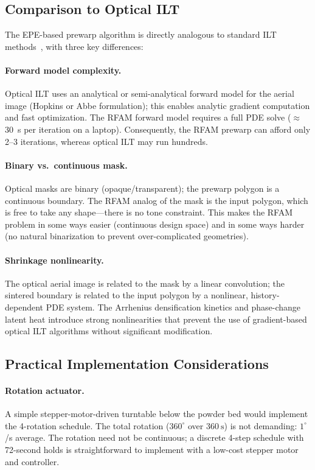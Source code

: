\documentclass[10pt,twocolumn]{article}
\begin{document}
\subsection{Comparison to Optical ILT}

The EPE-based prewarp algorithm is directly analogous to standard ILT
methods~\cite{Jia2014ilt,Shen2009ilt}, with three key differences:

\paragraph{Forward model complexity.}
Optical ILT uses an analytical or semi-analytical forward model for the
aerial image (Hopkins or Abbe formulation); this enables analytic
gradient computation and fast optimization.  The RFAM forward model
requires a full PDE solve ($\approx$\SI{30}{\second} per iteration on a
laptop).  Consequently, the RFAM prewarp can afford only 2--3 iterations,
whereas optical ILT may run hundreds.

\paragraph{Binary vs.\ continuous mask.}
Optical masks are binary (opaque/transparent); the prewarp polygon is
a continuous boundary.  The RFAM analog of the mask is the input
polygon, which is free to take any shape---there is no tone
constraint.  This makes the RFAM problem in some ways easier
(continuous design space) and in some ways harder (no natural
binarization to prevent over-complicated geometries).

\paragraph{Shrinkage nonlinearity.}
The optical aerial image is related to the mask by a linear
convolution; the sintered boundary is related to the input polygon by
a nonlinear, history-dependent PDE system.  The Arrhenius densification
kinetics and phase-change latent heat introduce strong nonlinearities
that prevent the use of gradient-based optical ILT algorithms without
significant modification.

\subsection{Practical Implementation Considerations}

\paragraph{Rotation actuator.}
A simple stepper-motor-driven turntable below the powder bed would
implement the 4-rotation schedule.  The total rotation ($360^\circ$
over $\SI{360}{\second}$) is not demanding: $1^\circ$/s average.  The
rotation need not be continuous; a discrete 4-step schedule with
72-second holds is straightforward to implement with a low-cost
stepper motor and controller.
\end{document}

